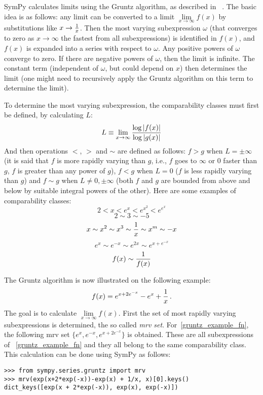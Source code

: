 SymPy calculates limits using the Gruntz algorithm, as described in%
~\cite{Gruntz1996limits}. The basic idea is as follows: any limit can be
converted to a limit $\lim\limits_{x\to\infty} f(x)$ by substitutions like
$x\to{1\over x}$. Then the most varying subexpression $\omega$ (that converges
to zero as $x\to\infty$ the fastest from all subexpressions) is identified in
$f(x)$, and $f(x)$ is expanded into a series with respect to $\omega$. Any
positive powers of $\omega$ converge to zero. If there are negative powers of
$\omega$, then the limit is infinite. The constant term (independent of
$\omega$, but could depend on $x$) then determines the limit (one might need to
recursively apply the Gruntz algorithm on this term to determine the limit).

To determine the most varying subexpression, the comparability classes must
first be defined, by calculating $L$:
\begin{equation}
L\equiv \lim_{x\to\infty} {\log |f(x)| \over \log |g(x)|}
\end{equation}
And then operations $<$, $>$ and $\sim$ are defined as follows: $f>g$ when
$L=\pm\infty$ (it is said that $f$ is more rapidly varying than $g$, i.e., $f$
goes to $\infty$ or $0$ faster than $g$, $f$ is greater than any power of $g$),
$f<g$ when $L=0$ ($f$ is less rapidly varying than $g$) and $f\sim g$ when
$L\neq 0,\pm\infty$ (both $f$ and $g$ are bounded from above and below by
suitable integral powers of the other). Here are some examples of comparability
classes:
$$2 < x < e^x < e^{x^2} < e^{e^x}$$
$$2\sim 3\sim -5$$
$$x\sim x^2\sim x^3\sim {1\over x}\sim x^m\sim -x$$
$$e^x\sim e^{-x}\sim e^{2x}\sim e^{x+e^{-x}}$$
$$f(x)\sim{1\over f(x)}$$

The Gruntz algorithm is now illustrated on the following example:
\begin{equation}
    \label{gruntz_example_fn}
f(x) = e^{x+2e^{-x}} - e^x + {1\over x} \,.
\end{equation}
The goal is to calculate $\lim\limits_{x\to\infty} f(x)$.
First the set of most rapidly varying subexpressions is determined, the so
called \textit{mrv set}. For~\eqref{gruntz_example_fn}, the following mrv set
$\{e^x, e^{-x}, e^{x+2e^{-x}}\}$ is obtained. These are all subexpressions of%
~\eqref{gruntz_example_fn} and they all belong to the same comparability class.
This calculation can be done using SymPy as follows:

\begin{verbatim}
>>> from sympy.series.gruntz import mrv
>>> mrv(exp(x+2*exp(-x))-exp(x) + 1/x, x)[0].keys()
dict_keys([exp(x + 2*exp(-x)), exp(x), exp(-x)])
\end{verbatim}

